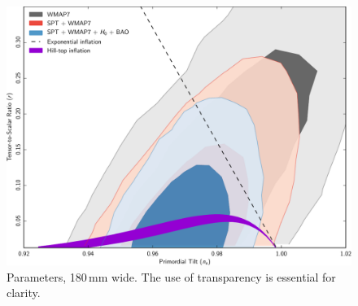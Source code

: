 \documentclass[traditabstract]{aa}
\begin{document}
\begin{figure}[H!b]
\includegraphics[width=18cm]{PlanckFig_parameters_python_180mm}
\caption{Parameters, 180\,mm wide.  The use of transparency is essential for clarity.}
\label{fig:parameters_python180}
\end{figure}
\end{document}

